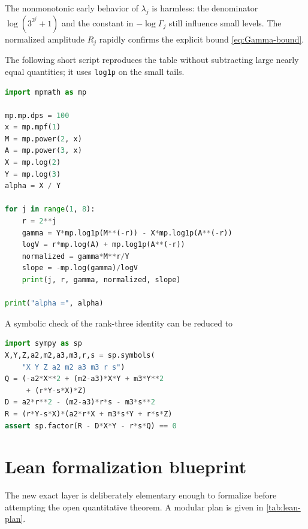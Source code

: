 \documentclass[11pt]{article}
\theoremstyle{definition}
\begin{document}
The nonmonotonic early behavior of $\lambda_j$ is harmless: the denominator
$\log(3^{2^j}+1)$ and the constant in $-\log\Gamma_j$ still influence small levels.
The normalized amplitude $R_j$ rapidly confirms the explicit bound
\eqref{eq:Gamma-bound}.

The following short script reproduces the table without subtracting large nearly equal
quantities; it uses \texttt{log1p} on the small tails.

\begin{lstlisting}[language=Python,caption={High-precision numerical calibration.}]
import mpmath as mp

mp.mp.dps = 100
x = mp.mpf(1)
M = mp.power(2, x)
A = mp.power(3, x)
X = mp.log(2)
Y = mp.log(3)
alpha = X / Y

for j in range(1, 8):
    r = 2**j
    gamma = Y*mp.log1p(M**(-r)) - X*mp.log1p(A**(-r))
    logV = r*mp.log(A) + mp.log1p(A**(-r))
    normalized = gamma*M**r/Y
    slope = -mp.log(gamma)/logV
    print(j, r, gamma, normalized, slope)

print("alpha =", alpha)
\end{lstlisting}

A symbolic check of the rank-three identity can be reduced to
\begin{lstlisting}[language=Python,caption={Symbolic verification of the certificate identity.}]
import sympy as sp
X,Y,Z,a2,m2,a3,m3,r,s = sp.symbols(
    "X Y Z a2 m2 a3 m3 r s")
Q = (-a2*X**2 + (m2-a3)*X*Y + m3*Y**2
     + (r*Y-s*X)*Z)
D = a2*r**2 - (m2-a3)*r*s - m3*s**2
R = (r*Y-s*X)*(a2*r*X + m3*s*Y + r*s*Z)
assert sp.factor(R - D*X*Y - r*s*Q) == 0
\end{lstlisting}

\section{Lean formalization blueprint}\label{sec:lean}

The new exact layer is deliberately elementary enough to formalize before attempting the
open quantitative theorem.  A modular plan is given in \cref{tab:lean-plan}.
\end{document}
